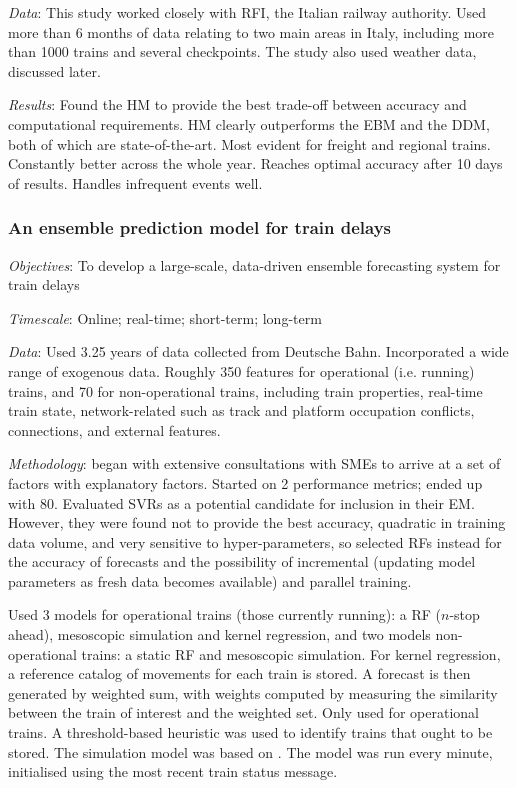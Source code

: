 \documentclass{article}
\begin{document}
\smallskip

\textit{Data}: This study worked closely with RFI, the Italian railway authority. Used more than 6 months of data relating to two main areas in Italy, including more than 1000 trains and several checkpoints. The study also used weather data, discussed later. 

\smallskip

\textit{Results}: Found the HM to provide the best trade-off between accuracy and computational requirements. HM clearly outperforms the EBM and the DDM, both of which are state-of-the-art. Most evident for freight and regional trains. Constantly better across the whole year. Reaches optimal accuracy after 10 days of results. Handles infrequent events well. 

\subsubsection{An ensemble prediction model for train delays \cite{nair_et_al_2019}}

\textit{Objectives}: To develop a large-scale, data-driven ensemble forecasting system for train delays

\smallskip

\textit{Timescale}: Online; real-time; short-term; long-term

\smallskip

\textit{Data}: Used 3.25 years of data collected from Deutsche Bahn. Incorporated a wide range of exogenous data. Roughly 350 features for operational (i.e. running) trains, and 70 for non-operational trains, including train properties, real-time train state, network-related such as track and platform occupation conflicts, connections, and external features. 

\smallskip

\textit{Methodology}: began with extensive consultations with SMEs to arrive at a set of factors with explanatory factors. Started on 2 performance metrics; ended up with 80. Evaluated SVRs as a potential candidate for inclusion in their EM. However, they were found not to provide the best accuracy, quadratic in training data volume, and very sensitive to hyper-parameters, so selected RFs instead for the accuracy of forecasts and the possibility of incremental (updating model parameters as fresh data becomes available) and parallel training. 

Used 3 models for operational trains (those currently running): a RF ($n$-stop ahead), mesoscopic simulation and kernel regression, and two models non-operational trains: a static RF and mesoscopic simulation. For kernel regression, a reference catalog of movements for each train is stored. A forecast is then generated by weighted sum, with weights computed by measuring the similarity between the train of interest and the weighted set. Only used for operational trains. A threshold-based heuristic was used to identify trains that ought to be stored. The simulation model was based on \cite{szabo_et_al_2017}. The model was run every minute, initialised using the most recent train status message. 
\end{document}
